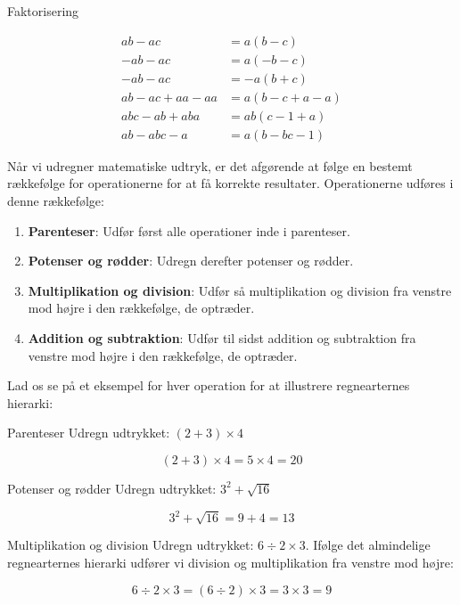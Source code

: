 \newpage

\begin{example} Faktorisering

\begin{align*}
ab - ac &= a(b - c) \\
-ab - ac &= a(-b - c) \\
-ab - ac &= -a(b + c) \\
ab - ac + aa - aa &= a(b - c + a - a) \\
abc - ab + aba &= ab(c - 1 + a) \\
ab - abc - a &= a(b - bc - 1)
\end{align*}

\end{example}

Når vi udregner matematiske udtryk, er det afgørende at følge en bestemt rækkefølge for operationerne for at få korrekte resultater. Operationerne udføres i denne rækkefølge:

\begin{enumerate}
    \item \textbf{Parenteser}: Udfør først alle operationer inde i parenteser.
    \item \textbf{Potenser og rødder}: Udregn derefter potenser og rødder.
    \item \textbf{Multiplikation og division}: Udfør så multiplikation og division fra venstre mod højre i den rækkefølge, de optræder.
    \item \textbf{Addition og subtraktion}: Udfør til sidst addition og subtraktion fra venstre mod højre i den rækkefølge, de optræder.
\end{enumerate}

Lad os se på et eksempel for hver operation for at illustrere regnearternes hierarki:

\begin{example} Parenteser \newline
Udregn udtrykket: \((2 + 3) \times 4\)

\[
(2 + 3) \times 4 = 5 \times 4 = 20
\]
\end{example}

\begin{example} Potenser og rødder \newline
Udregn udtrykket: \(3^2 + \sqrt{16}\)

\[
3^2 + \sqrt{16} = 9 + 4 = 13
\]
\end{example}

\begin{example} Multiplikation og division \newline
Udregn udtrykket: \(6 \div 2 \times 3\). Ifølge det almindelige regnearternes hierarki udfører vi division og multiplikation fra venstre mod højre:

\[
6 \div 2 \times 3 = (6 \div 2) \times 3 = 3 \times 3 = 9
\]

\end{example}

